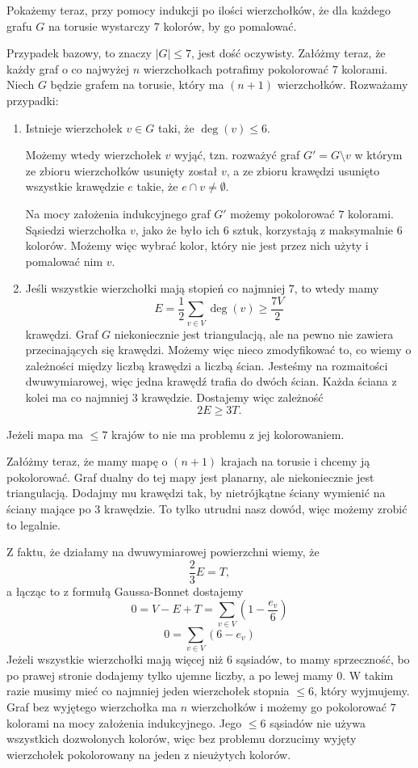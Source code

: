 \begin{enumerate}[label=\textbf{(\alph*)}]
    Pokażemy teraz, przy pomocy indukcji po ilości wierzchołków, że dla każdego grafu $G$ na torusie wystarczy $7$ kolorów, by go pomalować. 

    Przypadek bazowy, to znaczy $|G|\leq 7$, jest dość oczywisty. Załóżmy teraz, że każdy graf o co najwyżej $n$ wierzchołkach potrafimy pokolorować $7$ kolorami. Niech $G$ będzie grafem na torusie, który ma $(n+1)$ wierzchołków. Rozważamy przypadki:
    \begin{enumerate}[label=\arabic*.]
      \item Istnieje wierzchołek $v\in G$ taki, że $\deg(v)\leq6$.

        Możemy wtedy wierzchołek $v$ wyjąć, tzn. rozważyć graf $G'=G\setminus v$ w którym ze zbioru wierzchołków usunięty został $v$, a ze zbioru krawędzi usunięto wszystkie krawędzie $e$ takie, że $e\cap v\neq \emptyset$.

        Na mocy założenia indukcyjnego graf $G'$ możemy pokolorować $7$ kolorami. Sąsiedzi wierzchołka $v$, jako że było ich $6$ sztuk, korzystają z maksymalnie $6$ kolorów. Możemy więc wybrać kolor, który nie jest przez nich użyty i pomalować nim $v$.

      \item Jeśli wszystkie wierzchołki mają stopień co najmniej $7$, to wtedy mamy 
        $$E=\frac{1}{2}\sum_{v\in V}\deg(v)\geq \frac{7V}{2}$$ 
        krawędzi. Graf $G$ niekoniecznie jest triangulacją, ale na pewno nie zawiera przecinających się krawędzi. Możemy więc nieco zmodyfikować to, co wiemy o zależności między liczbą krawędzi a liczbą ścian. Jesteśmy na rozmaitości dwuwymiarowej, więc jedna krawędź trafia do dwóch ścian. Każda ściana z kolei ma co najmniej $3$ krawędzie. Dostajemy więc zależność
        $$2E\geq 3T.$$

    \end{enumerate}




    Jeżeli mapa ma $\leq 7$ krajów to nie ma problemu z jej kolorowaniem. 

    Załóżmy teraz, że mamy mapę o $(n+1)$ krajach na torusie i chcemy ją pokolorować. Graf dualny do tej mapy jest planarny, ale niekoniecznie jest triangulacją. Dodajmy mu krawędzi tak, by nietrójkątne ściany wymienić na ściany mające po $3$ krawędzie. To tylko utrudni nasz dowód, więc możemy zrobić to legalnie.

    Z faktu, że działamy na dwuwymiarowej powierzchni wiemy, że 
    $$\frac{2}{3}E=T,$$
    a łącząc to z formułą Gaussa-Bonnet dostajemy
    $$0=V-E+T=\sum_{v\in V}(1-\frac{e_v}{6})$$
    $$0=\sum_{v\in V}(6-e_v)$$
    Jeżeli wszystkie wierzchołki mają więcej niż $6$ sąsiadów, to mamy sprzeczność, bo po prawej stronie dodajemy tylko ujemne liczby, a po lewej mamy $0$. W takim razie musimy mieć co najmniej jeden wierzchołek stopnia $\leq 6$, który wyjmujemy. Graf bez wyjętego wierzchołka ma $n$ wierzchołków i możemy go pokolorować $7$ kolorami na mocy założenia indukcyjnego. Jego $\leq 6$ sąsiadów nie używa wszystkich dozwolonych kolorów, więc bez problemu dorzucimy wyjęty wierzchołek pokolorowany na jeden z nieużytych kolorów.


\end{enumerate}
